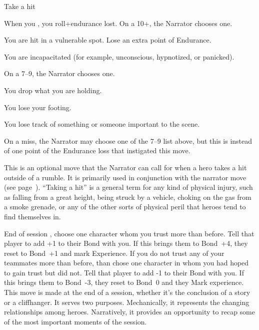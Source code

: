 \begin{movedef}{Take a hit}
{
  When you , you roll+endurance lost. On a 10+, the
  Narrator chooses one.
  \begin{choices}
  \item You are hit in a vulnerable spot. Lose an extra point of Endurance.
  \item You are incapacitated (for example, unconscious, hypnotized, or panicked).
  \end{choices}
  On a 7--9, the Narrator chooses one.
  \begin{choices}
  \item You drop what you are holding.
  \item You lose your footing.
  \item You lose track of something or someone important to the scene.
  \end{choices}
  On a miss, the Narrator may choose one of the 7--9 list above,
  but this is instead of one point of the Endurance loss that
  instigated this move.
}
{
  This is an optional move that the Narrator can call for
  when a hero takes a hit outside of a rumble.
  It is primarily used in conjunction with the  narrator move (see page~\pageref{move:reduce-endurance}).
  ``Taking a hit'' is a general term for any kind of physical
  injury, such as falling from a great height, being struck by
  a vehicle, choking on the gas from a smoke grenade,
  or any of the other sorts of physical peril that heroes tend
  to find themselves in.
}
\end{movedef}

\begin{movedef}{End of session}
{
  , choose one character
  whom you trust more than before. Tell that player to add +1
  to their Bond with you. If this brings them to Bond~+4, they reset
  to Bond~+1 and mark Experience. If you do not trust any of your
  teammates more than before, than chose one character in whom you
  had hoped to gain trust but did not. Tell that player to add -1 to
  their Bond with you. If this brings them to Bond~-3, they reset to
  Bond~0 and they Mark experience.
}
{
  This move is made at the end of a session, whether it's the
  conclusion of a story or a cliffhanger.
  It serves two purposes. Mechanically, it represents the changing
  relationships among heroes. Narratively, it provides an opportunity
  to recap some of the most important moments of the session.
}
\end{movedef}